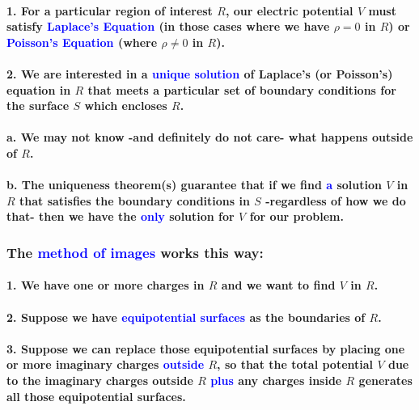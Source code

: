 \documentclass{article}
\begin{document}
\paragraph{1. For a particular region of interest $R$, our electric potential $V$ must satisfy \textcolor{blue}{Laplace's Equation} (in those cases where we have $\rho=0$ in $R$) or \textcolor{blue}{Poisson's Equation} (where $\rho\neq 0$ in $R$).}
\paragraph{2. We are interested in a \textcolor{blue}{unique solution} of Laplace's (or Poisson's) equation in $R$ that meets a particular set of boundary conditions for the surface $S$ which encloses $R$.}
\paragraph{\indent a. We may not know -and definitely do not care- what happens outside of $R$.}
\paragraph{\indent b. The uniqueness theorem(s) guarantee that if we find \textcolor{blue}{a} solution $V$ in $R$ that satisfies the boundary conditions in $S$ -regardless of how we do that- then we have the \textcolor{blue}{only} solution for $V$ for our problem.}
\subsubsection{The \textcolor{blue}{method of images} works this way:}
\paragraph{1. We have one or more charges in $R$ and we want to find $V$ in $R$.}
\paragraph{2. Suppose we have \textcolor{blue}{equipotential surfaces} as the boundaries of $R$.}
\paragraph{3. Suppose we can replace those equipotential surfaces by placing one or more imaginary charges \textcolor{blue}{outside} $R$, so that the total potential $V$ due to the imaginary charges outside $R$ \textcolor{blue}{plus} any charges inside $R$ generates all those equipotential surfaces.}
\end{document}
